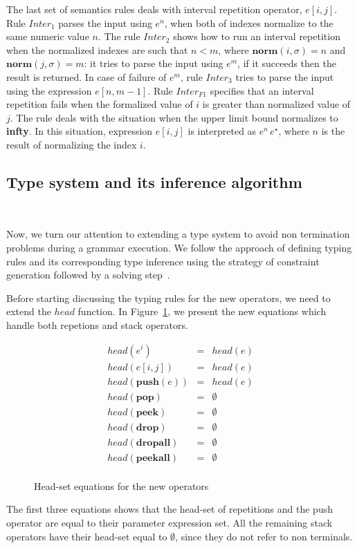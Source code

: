 \documentclass[preprint,12pt]{elsarticle}
\theoremstyle{definition}
\begin{document}
The last set of semantics rules deals with interval repetition operator,
$e[i,j]$. Rule $Inter_{1}$ parses the input using $e^n$, when both of indexes
normalize to the same numeric value $n$. The rule $Inter_2$ shows how to run
an interval repetition when the normalized indexes are such that $n < m$,
where $\mathbf{norm}(i,\sigma) = n$ and $\mathbf{norm}(j,\sigma) = m$:
it tries to parse the input using $e^m$, if it succeeds then the result is
returned. In case of failure of $e^m$, rule $Inter_3$ tries
to parse the input using the expression $e[n, m -1]$.
Rule $Inter_{F1}$ specifies that an interval repetition fails when the formalized value of $i$
is greater than normalized value of $j$.
The rule deals with the situation when the upper limit bound normalizes to \textbf{infty}.
In this situation, expression $e[i,j]$ is interpreted as $e^{n}\,e^{\star}$, where $n$ is the
result of normalizing the index $i$.

\subsection{Type system and its inference algorithm}~\label{sec:typesystem}

Now, we turn our attention to extending a type system to avoid
non termination problems during a grammar execution. We follow
the approach of defining typing rules and its corresponding
type inference using the strategy of constraint generation
followed by a solving step~\cite{Ribeiro19,Cardoso23, Pottier05}.

Before starting discussing the typing rules for the new operators,
we need to extend the $head$ function. In Figure~\ref{fig:new-head-set},
we present the new equations which handle both repetions and stack
operators.

\begin{figure}[H]
  \[
    \begin{array}{lcl}
      head(e^i) & = & head(e)\\
      head(e[i,j]) & = & head(e)\\
      head(\mathbf{push}(e)) & = & head(e)\\
      head(\mathbf{pop}) & = & \emptyset\\
      head(\mathbf{peek}) & = & \emptyset\\
      head(\mathbf{drop}) & = & \emptyset\\
      head(\mathbf{dropall}) & = & \emptyset\\
      head(\mathbf{peekall}) & = & \emptyset\\
    \end{array}
  \]
  \caption{Head-set equations for the new operators}
  \label{fig:new-head-set}
\end{figure}
The first three equations shows that the head-set of
repetitions and the push operator are equal to their
parameter expression set. All the remaining stack operators
have their head-set equal to $\emptyset$, since they do not
refer to non terminals.
\end{document}
